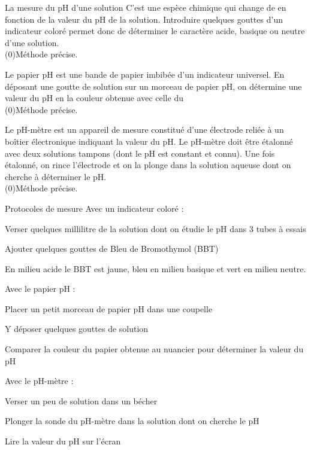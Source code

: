 \begin{doc}{La mesure du pH d'une solution}
  \pointCyan {}
  C’est une espèce chimique qui change de  en fonction de la valeur du pH de la solution.
  Introduire quelques gouttes d’un indicateur coloré permet donc de déterminer le caractère acide, basique ou neutre d’une solution. \\
  \flecheLongue \texteTrou(0){Méthode  précise.}

  \pointCyan {}
  Le papier pH est une bande de papier imbibée d’un indicateur universel.
  En déposant une goutte de solution sur un morceau de papier pH, on détermine une valeur  du pH en  la couleur obtenue avec celle du  \\  
  \flecheLongue \texteTrou(0){Méthode  précise.}

  \pointCyan {}
  Le pH-mètre est un appareil de mesure constitué d’une électrode reliée à un boîtier électronique indiquant la valeur du pH.
  Le pH-mètre doit être étalonné avec deux solutions tampons (dont le pH est constant et connu).
  Une fois étalonné, on rince l’électrode et on la plonge dans la solution aqueuse dont on cherche à déterminer le pH. \\
  \flecheLongue \texteTrou(0){Méthode  précise.}
\end{doc}

\begin{doc}{Protocoles de mesure}
  Avec un indicateur coloré :
  \begin{protocole}
    \item Verser quelques millilitre de la solution dont on étudie le pH dans 3 tubes à essais
    \item Ajouter quelques gouttes de Bleu de Bromothymol (BBT)
    \item En milieu acide le BBT est jaune, bleu en milieu basique et vert en milieu neutre.
  \end{protocole}
  
  Avec le papier pH :
  \begin{protocole}
    \item Placer un petit morceau de papier pH dans une coupelle
    \item Y déposer quelques gouttes de solution
    \item Comparer la couleur du papier obtenue au nuancier pour déterminer la valeur du pH
  \end{protocole}
  
  Avec le pH-mètre :
  \begin{protocole}
    \item Verser un peu de solution dans un bécher
    \item Plonger la sonde du pH-mètre dans la solution dont on cherche le pH
    \item Lire la valeur du pH sur l’écran
  \end{protocole}
\end{doc}

